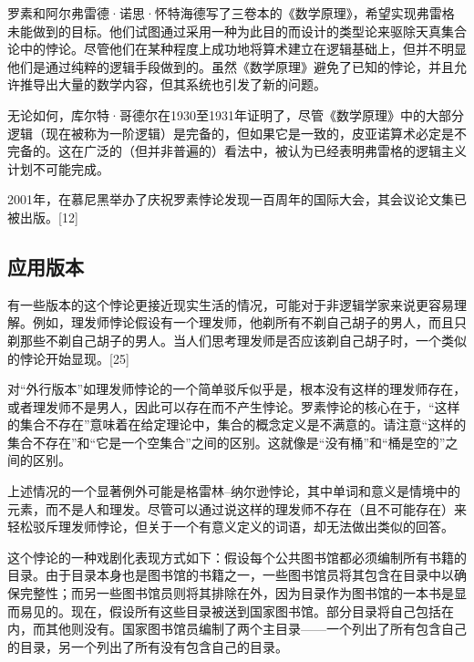 罗素和阿尔弗雷德·诺思·怀特海德写了三卷本的《数学原理》，希望实现弗雷格未能做到的目标。他们试图通过采用一种为此目的而设计的类型论来驱除天真集合论中的悖论。尽管他们在某种程度上成功地将算术建立在逻辑基础上，但并不明显他们是通过纯粹的逻辑手段做到的。虽然《数学原理》避免了已知的悖论，并且允许推导出大量的数学内容，但其系统也引发了新的问题。

无论如何，库尔特·哥德尔在1930至1931年证明了，尽管《数学原理》中的大部分逻辑（现在被称为一阶逻辑）是完备的，但如果它是一致的，皮亚诺算术必定是不完备的。这在广泛的（但并非普遍的）看法中，被认为已经表明弗雷格的逻辑主义计划不可能完成。

2001年，在慕尼黑举办了庆祝罗素悖论发现一百周年的国际大会，其会议论文集已被出版。[12]
\subsection{应用版本}
有一些版本的这个悖论更接近现实生活的情况，可能对于非逻辑学家来说更容易理解。例如，理发师悖论假设有一个理发师，他剃所有不剃自己胡子的男人，而且只剃那些不剃自己胡子的男人。当人们思考理发师是否应该剃自己胡子时，一个类似的悖论开始显现。[25]

对“外行版本”如理发师悖论的一个简单驳斥似乎是，根本没有这样的理发师存在，或者理发师不是男人，因此可以存在而不产生悖论。罗素悖论的核心在于，“这样的集合不存在”意味着在给定理论中，集合的概念定义是不满意的。请注意“这样的集合不存在”和“它是一个空集合”之间的区别。这就像是“没有桶”和“桶是空的”之间的区别。

上述情况的一个显著例外可能是格雷林–纳尔逊悖论，其中单词和意义是情境中的元素，而不是人和理发。尽管可以通过说这样的理发师不存在（且不可能存在）来轻松驳斥理发师悖论，但关于一个有意义定义的词语，却无法做出类似的回答。

这个悖论的一种戏剧化表现方式如下：假设每个公共图书馆都必须编制所有书籍的目录。由于目录本身也是图书馆的书籍之一，一些图书馆员将其包含在目录中以确保完整性；而另一些图书馆员则将其排除在外，因为目录作为图书馆的一本书是显而易见的。现在，假设所有这些目录被送到国家图书馆。部分目录将自己包括在内，而其他则没有。国家图书馆员编制了两个主目录——一个列出了所有包含自己的目录，另一个列出了所有没有包含自己的目录。